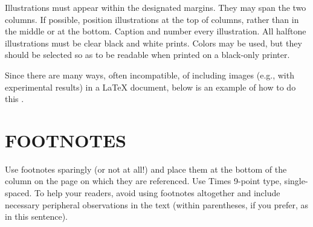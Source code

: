 \documentclass{article}
\begin{document}
Illustrations must appear within the designated margins.  They may span the two
columns.  If possible, position illustrations at the top of columns, rather
than in the middle or at the bottom.  Caption and number every illustration.
All halftone illustrations must be clear black and white prints.  Colors may be
used, but they should be selected so as to be readable when printed on a
black-only printer.

Since there are many ways, often incompatible, of including images (e.g., with
experimental results) in a LaTeX document, below is an example of how to do
this \cite{Lamp86}.

%

\vfill
\pagebreak

\section{FOOTNOTES}
\label{sec:foot}

Use footnotes sparingly (or not at all!) and place them at the bottom of the
column on the page on which they are referenced. Use Times 9-point type,
single-spaced. To help your readers, avoid using footnotes altogether and
include necessary peripheral observations in the text (within parentheses, if
you prefer, as in this sentence).
\end{document}
